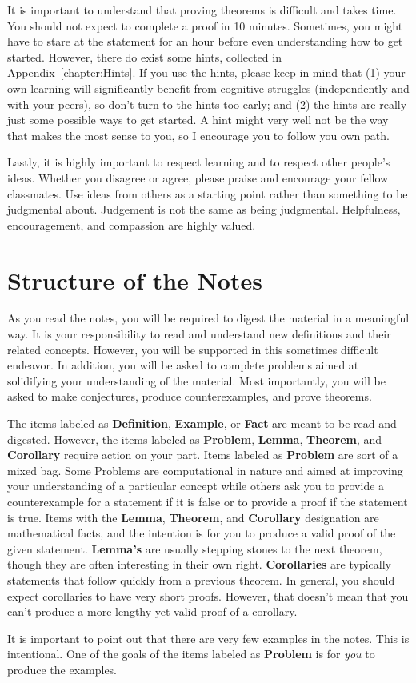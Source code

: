 It is important to understand that proving theorems is difficult and takes time. You should not expect to complete a proof in 10 minutes. Sometimes, you might have to stare at the statement for an hour before even understanding how to get started. However, there do exist some hints, collected in Appendix~\ref{chapter:Hints}. If you use the hints, please keep in mind that (1) your own learning will significantly benefit from cognitive struggles (independently and with your peers), so don't turn to the hints too early; and (2) the hints are really just some possible ways to get started. A hint might very well not be the way that makes the most sense to you, so I encourage you to follow you own path. 


Lastly, it is highly important to respect learning and to respect other people's ideas.  Whether you disagree or agree, please praise and encourage your fellow classmates.  Use ideas from others as a starting point rather than something to be judgmental about.  Judgement is not the same as being judgmental.  Helpfulness, encouragement, and compassion are highly valued.

\section{Structure of the Notes}
As you read the notes, you will be required to digest the material in a meaningful way.  It is your responsibility to read and understand new definitions and their related concepts.  However, you will be supported in this sometimes difficult endeavor. In addition, you will be asked to complete problems aimed at solidifying your understanding of the material.  Most importantly, you will be asked to make conjectures, produce counterexamples, and prove theorems.

The items labeled as \textbf{Definition}, \textbf{Example}, or \textbf{Fact} are meant to be read and digested.  However, the items labeled as \textbf{Problem}, \textbf{Lemma}, \textbf{Theorem}, and \textbf{Corollary} require action on your part.  Items labeled as \textbf{Problem} are sort of a mixed bag. Some Problems are computational in nature and aimed at improving your understanding of a particular concept while others ask you to provide a counterexample for a statement if it is false or to provide a proof if the statement is true. Items with the \textbf{Lemma}, \textbf{Theorem}, and \textbf{Corollary} designation are mathematical facts, and the intention is for you to produce a valid proof of the given statement.  \textbf{Lemma's} are usually stepping stones to the next theorem, though they are often  interesting in their own right. \textbf{Corollaries}  are typically statements that follow quickly from a previous theorem. In general, you should expect corollaries to have very short proofs.  However, that doesn't mean that you can't produce a more lengthy yet valid proof of a corollary. 

It is important to point out that there are very few examples in the notes.  This is intentional.  One of the goals of the items labeled as \textbf{Problem} is for \emph{you} to produce the examples.
 

